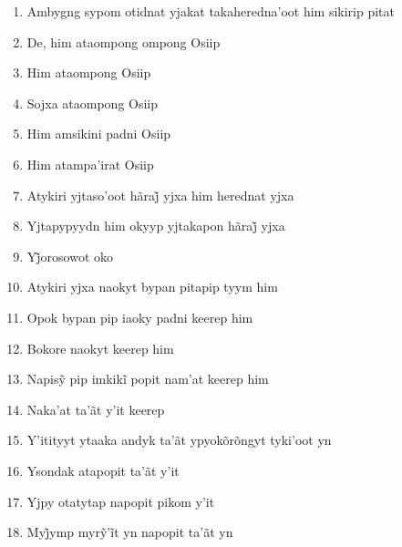 \begin{enumerate}
 \begin{center}\end{center}

 \item Ambygng sypom otidnat yjakat takaheredna'oot him sikirip pitat

 \item De, him ataompong ompong Osiip

 \item Him ataompong Osiip

 \item Sojxa ataompong Osiip

 \item Him amsikini padni Osiip

 \item Him atampa'irat Osiip

 \item Atykiri yjtaso’oot hãraj̃ yjxa him herednat yjxa

 \begin{center}\end{center}

 \item Yjtapypyydn him okyyp yjtakapon hãraj̃ yjxa

 \item Yj̃orosowot oko

 \item Atykiri yjxa naokyt bypan pitapip tyym him

 \item Opok bypan pip iaoky padni keerep him

 \item Bokore naokyt keerep him

 \item Napisỹ pip imkikĩ popit nam’at keerep him

 \begin{center}\end{center}

 \item Naka'at ta'ãt y'it keerep

 \item Y'itityyt ytaaka andyk ta'ãt ypyokõrõngyt tyki'oot yn

 \item Ysondak atapopit ta'ãt y'it

 \item Yjpy otatytap napopit pikom y'it

 \item Myj̃ymp myrỹ’ĩt yn napopit ta’ãt yn


\end{enumerate}
